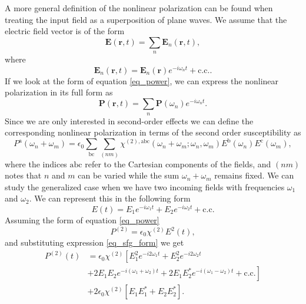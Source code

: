 A more general definition of the nonlinear polarization can be found when
treating the input field as a superposition of plane waves. We assume that the
electric field vector is of the form
\begin{equation}
\mathbf{E}(\mathbf{r},t) = \sum_{n}\mathbf{E}_{n}(\mathbf{r},t),
\end{equation}
where
\begin{equation}
\mathbf{E}_{n}(\mathbf{r},t)
= \mathbf{E}_{n}(\mathbf{r})e^{-i\omega_{n}t} + \text{c.c.}.
\end{equation}
If we look at the form of equation \eqref{eq_power}, we can express the
nonlinear polarization in its full form as
\begin{equation}
\mathbf{P}(\mathbf{r},t) = \sum_{n}\mathbf{P}(\omega_{n})e^{-i\omega_{n}t}.
\end{equation}
Since we are only interested in second-order effects we can define the
corresponding nonlinear polarization in terms of the second order susceptibility
as
\begin{equation}
P^{\mathrm{a}}(\omega_{n} + \omega_{m})
= \epsilon_{0}\sum_{\mathrm{bc}}\sum_{(nm)}
\chi^{(2),\mathrm{abc}}(\omega_{n}+\omega_{m};\omega_{n},\omega_{m})
E^{\mathrm{b}}(\omega_{n})E^{\mathrm{c}}(\omega_{m}),\label{eq_nonlin_p}
\end{equation}
where the indices $\mathrm{abc}$ refer to the Cartesian components of the
fields, and $(nm)$ notes that $n$ and $m$ can be varied while the sum
$\omega_{n} + \omega_{m}$ remains fixed. We can study the generalized case when
we have two incoming fields with frequencies $\omega_{1}$ and $\omega_{2}$. We
can represent this in the following form
\begin{equation}
E(t) = E_{1}e^{-i\omega_{1}t} + E_{2}e^{-i\omega_{2}t} + \text{c.c.}\label{eq_sfg_form}
\end{equation}
Assuming the form of equation \eqref{eq_power}
\begin{equation}
P^{(2)} = \epsilon_{0}\chi^{(2)}E^{2}(t),
\end{equation}
and substituting expression \eqref{eq_sfg_form} we get
\begin{align}
P^{(2)}(t)
&= \epsilon_{0}\chi^{(2)}\left[E^{2}_{1}e^{-i2\omega_{1}t}
 + E^{2}_{2}e^{-i2\omega_{2}t}\right.\nonumber\\
&+ \left. 2E_{1}E_{2}e^{-i(\omega_{1}+\omega_{2})t}
 + 2E_{1}E^{\ast}_{2}e^{-i(\omega_{1}-\omega_{2})t}
 + \text{c.c.}\right]\nonumber\\
&+ 2\epsilon_{0}\chi^{(2)}\left[E_{1}E^{\ast}_{1}
 + E_{2}E^{\ast}_{2}\right].\label{eq_second_order}
\end{align}
